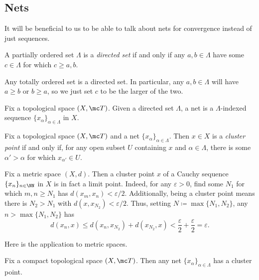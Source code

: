 \documentclass[../notes.tex]{subfiles}
\begin{document}
\subsection{Nets}
It will be beneficial to us to be able to talk about nets for convergence instead of just sequences.
\begin{definition}
	A partially ordered set $\Lambda$ is a \textit{directed set} if and only if any $a,b\in\Lambda$ have some $c\in\Lambda$ for which $c\ge a,b$.
\end{definition}
\begin{example}
	Any totally ordered set is a directed set. In particular, any $a,b\in\Lambda$ will have $a\ge b$ or $b\ge a$, so we just set $c$ to be the larger of the two.
\end{example}
\begin{definition}[Net]
	Fix a topological space $(X,\mc T)$. Given a directed set $\Lambda$, a net is a $\Lambda$-indexed sequence $\{x_\alpha\}_{\alpha\in\Lambda}$ in $X$.
\end{definition}
\begin{definition}
	Fix a topological space $(X,\mc T)$ and a net $\{x_\alpha\}_{\alpha\in\Lambda}$. Then $x\in X$ is a \textit{cluster point} if and only if, for any open subset $U$ containing $x$ and $\alpha\in\Lambda$, there is some $\alpha'>\alpha$ for which $x_{\alpha'}\in U$.
\end{definition}
\begin{remark} \label{rem:cluster-is-limit}
	Fix a metric space $(X,d)$. Then a cluster point $x$ of a Cauchy sequence $\{x_n\}_{n\in\NN}$ in $X$ is in fact a limit point. Indeed, for any $\varepsilon>0$, find some $N_1$ for which $m,n\ge N_1$ has $d(x_m,x_n)<\varepsilon/2$. Additionally, being a cluster point means there is $N_2>N_1$ with $d(x,x_{N_2})<\varepsilon/2$. Thus, setting $N\coloneqq\max\{N_1,N_2\}$, any $n>\max\{N_1,N_2\}$ has
	\[d(x_n,x)\le d(x_n,x_{N_2})+d(x_{N_2},x)<\frac\varepsilon2+\frac\varepsilon2=\varepsilon.\]
\end{remark}
Here is the application to metric spaces.
\begin{proposition} \label{prop:nets-cluster}
	Fix a compact topological space $(X,\mc T)$. Then any net $\{x_\alpha\}_{\alpha\in\Lambda}$ has a cluster point.
\end{proposition}
\end{document}

